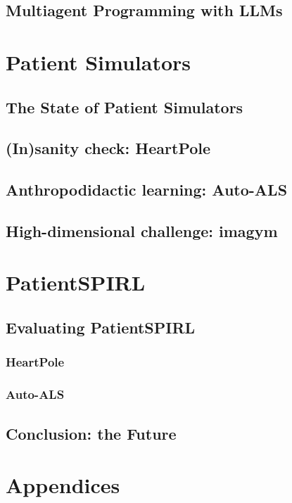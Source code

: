\newpage
\chapter{Multiagent Programming with LLMs}
\label{ch:seidr}
%

\part{Patient Simulators}
\label{part:simulators}

\newpage
\chapter{The State of Patient Simulators}
\label{ch:simulators-sota}

\newpage
\chapter{(In)sanity check: HeartPole}
\label{ch:heartpole}

\newpage
\chapter{Anthropodidactic learning: Auto-ALS}
\label{ch:auto-als}

\newpage
\chapter{High-dimensional challenge: imagym}
\label{ch:imagym}

\newpage


\part{PatientSPIRL}
\label{part:patientspirl}

\newpage
\chapter{Evaluating PatientSPIRL}
\label{ch:eval}

\section{HeartPole}

\section{Auto-ALS}

\newpage
\chapter{Conclusion: the Future}
\label{ch:conclusion}

\part{Appendices}

\newpage


\printbibliography


